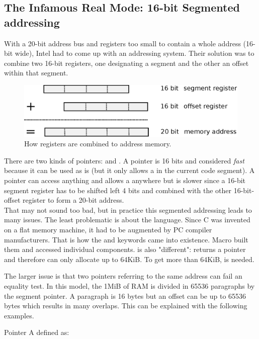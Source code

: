 \documentclass[book.tex]{subfiles}
\begin{document}
\subsection{The Infamous Real Mode: 16-bit Segmented addressing}
With a 20-bit address bus and registers too small to contain a whole address (16-bit wide), Intel had to come up with an addressing system. Their solution was to combine two 16-bit registers, one designating a segment and the other an offset within that segment.\\
\par
\begin{figure}[H]
\centering
\includegraphics[width=\textwidth]{imgs/drawings/register_combination_20_bits_address.eps}
\caption{How registers are combined to address memory.}
\label{fig:register_comb_to_20_bits}
\end{figure}
\par
There are two kinds of pointers:  and . A  pointer is 16 bits and considered \emph{fast} because it can be used as is (but it only allows a  in the current code segment). A  pointer can access anything and allows a  anywhere but is slower since a 16-bit segment register has to be shifted left 4 bits and combined with the other 16-bit-offset register to form a 20-bit address.\\

That may not sound too bad, but in practice this segmented addressing leads to many issues.
The least problematic is about the language. Since C was invented on a flat memory machine, it had to be augmented by PC compiler manufacturers. That is how the  and  keywords came into existence. Macro  built them and  accessed individual components.  is also "different":  returns a  pointer and therefore can only allocate up to 64KiB. To get more than 64KiB,  is needed.\\
\par
The larger issue is that two pointers referring to the same address can fail an equality test. In this model, the 1MiB of RAM is divided in 65536 paragraphs by the segment pointer. A paragraph is 16 bytes but an offset can be up to 65536 bytes which results in many overlaps. This can be explained with the following examples.\\
\par
Pointer A defined as:\\
\par
\begin{minipage}{\textwidth}

\end{minipage}
\end{document}
